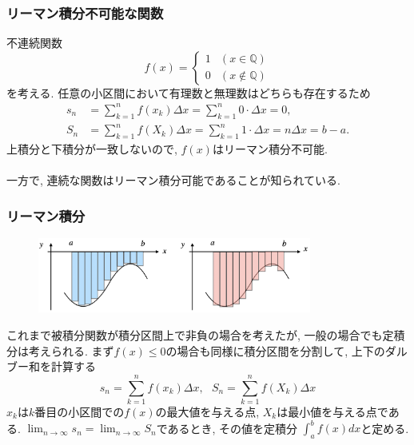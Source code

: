\documentclass[dvipdfmx,cjk,10.2pt]{beamer}
\newcommand{\Q}{\mathbb{Q}}
\theoremstyle{definition}
\begin{document}
\begin{frame}
\frametitle{リーマン積分不可能な関数}

不連続関数
$$
f(x)=
\begin{cases}
1 & (x \in \Q)\\
0 & (x \notin \Q)
\end{cases}
$$
を考える. 
任意の小区間において有理数と無理数はどちらも存在するため
\begin{align*}
s_n &= \sum_{k=1}^nf(x_k)\Delta x = \sum_{k=1}^n 0 \cdot \Delta x =0, \\
S_n &= \sum_{k=1}^nf(X_k)\Delta x = \sum_{k=1}^n 1 \cdot \Delta x =n \Delta x = b-a. 
\end{align*}
上積分と下積分が一致しないので, $f(x)$はリーマン積分不可能. \\
\ \\

一方で, 連続な関数はリーマン積分可能であることが知られている. 
\end{frame}





\begin{frame}
\frametitle{リーマン積分}

\vspace{-3mm}

\begin{figure}[htbp]
 \begin{center} 
  \includegraphics[width=90mm]{RiemannSum4.png}
 \end{center}
\end{figure}

\vspace{-3mm}

これまで被積分関数が積分区間上で非負の場合を考えたが, 一般の場合でも定積分は考えられる. 
まず$f(x) \le 0$の場合も同様に積分区間を分割して, 上下のダルブー和を計算する
$$
s_n = \sum_{k=1}^nf(x_k)\Delta x, \ \ \ S_n = \sum_{k=1}^nf(X_k)\Delta x
$$
$x_k$は$k$番目の小区間での$f(x)$の最大値を与える点, $X_k$は最小値を与える点である. 
$\displaystyle \lim_{n\to \infty} s_n = \lim_{n\to \infty} S_n$であるとき, その値を定積分
$\int_a^b f(x)dx$と定める. 


\end{frame}
\end{document}
